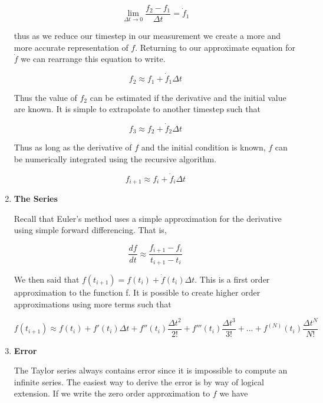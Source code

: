 \begin{enumerate}
\begin{equation}
  \lim_{\Delta t \rightarrow 0} \frac{f_2-f_1}{\Delta t} = \dot{f}_1
\end{equation}

thus as we reduce our timestep in our measurement we create a more
and more accurate representation of $f$. Returning to our
approximate equation for $\dot{f}$ we can rearrange this equation
to write.

\begin{equation}
  f_2 \approx f_1 + \dot{f}_1\Delta t 
\end{equation}

Thus the value of $f_2$ can be estimated if the derivative and the
initial value are known. It is simple to extrapolate to another
timestep such that

\begin{equation}
  f_3 \approx f_2 + \dot{f}_2\Delta t
\end{equation}

Thus as long as the derivative of $f$ and the initial condition is
known, $f$ can be numerically integrated using the recursive
algorithm.

\begin{equation}
  f_{i+1} \approx f_i + \dot{f}_i\Delta t
\end{equation}

\item{\bf The Series}

Recall that Euler's method uses a simple approximation for the
derivative using simple forward differencing. That is,

\begin{equation}
\frac{df}{dt} \approx \frac{f_{i+1} - f_i}{t_{i+1} - t_i}
\end{equation}

We then said that $f(t_{i+1}) = f(t_i) + \dot{f}(t_i)\Delta t$. This
is a first order approximation to the function f. It is possible to
create higher order approximations using more terms such that

\begin{equation}
f(t_{i+1}) \approx f(t_i) + f'(t_i)\Delta t +
f''(t_i)\frac{\Delta t^2}{2!} +
f'''(t_i)\frac{\Delta t^3}{3!} + ... + f^{(N)}(t_i)\frac{\Delta t^N}{N!}
\end{equation}

\item{\bf Error}

The Taylor series always contains error since it is impossible to
compute an infinite series. The easiest way to derive the error is by
way of logical extension. If we write the zero order approximation to
$f$ we have


\end{enumerate}
